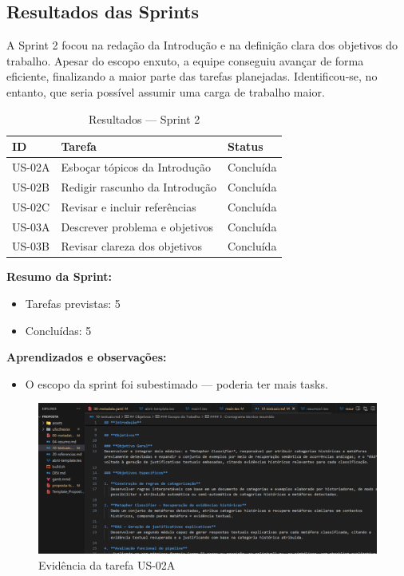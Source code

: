 \subsection{Resultados das Sprints}

A Sprint 2 focou na redação da Introdução e na definição clara dos objetivos do trabalho. Apesar do escopo enxuto, a equipe conseguiu avançar de forma eficiente, finalizando a maior parte das tarefas planejadas. Identificou-se, no entanto, que seria possível assumir uma carga de trabalho maior.

\begin{table}[htbp]
  \centering
  \caption{Resultados — Sprint 2}
  \label{tab:resultSprint2}
  \begin{tabular}{lll}
    \toprule
    ID & Tarefa & Status \\
    \midrule
    US-02A & Esboçar tópicos da Introdução & Concluída \\
    US-02B & Redigir rascunho da Introdução & Concluída \\
    US-02C & Revisar e incluir referências & Concluída \\
    US-03A & Descrever problema e objetivos & Concluída \\
    US-03B & Revisar clareza dos objetivos & Concluída \\
    \bottomrule
  \end{tabular}
\end{table}

\vspace{1em}
\noindent\textbf{Resumo da Sprint:}
\begin{itemize}[noitemsep]
  \item Tarefas previstas: 5
  \item Concluídas: 5
\end{itemize}

\noindent\textbf{Aprendizados e observações:}
\begin{itemize}
  \item O escopo da sprint foi subestimado — poderia ter mais tasks.
\end{itemize}

\begin{figure}[htbp]
  \centering
  \includegraphics[width=0.6\linewidth]{pictures/intro_topicos.png}
  \caption{Evidência da tarefa US-02A}
\end{figure}

